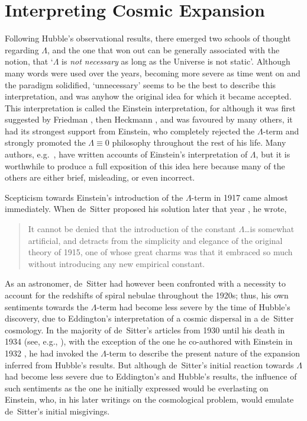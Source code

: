 \section{Interpreting Cosmic Expansion\label{sec_ICE}}
Following Hubble's observational results, there emerged two schools of thought regarding $\Lambda$, and the one that won out can be generally associated with the notion, that `$\Lambda$ is \textit{not necessary} as long as the Universe is not static'. Although many words were used over the years, becoming more severe as time went on and the paradigm solidified, `unnecessary' seems to be the best to describe this interpretation, and was anyhow the original idea for which it became accepted. This interpretation is called the Einstein interpretation, for although it was first suggested by Friedman \cite{Friedmann1922,Friedmann1999a}, then Heckmann \cite{Heckmann1931}, and was favoured by many others, it had its strongest support from Einstein, who completely rejected the $\Lambda$-term and strongly promoted the $\Lambda\equiv0$ philosophy throughout the rest of his life. Many authors, e.g.~\cite{Pais1982,Chandrasekhar1983,Weinberg1989,Padmanabhan2003}, have written accounts of Einstein's interpretation of $\Lambda$, but it is worthwhile to produce a full exposition of this idea here because many of the others are either brief, misleading, or even incorrect.

Scepticism towards Einstein's introduction of the $\Lambda$-term in 1917 \cite{Einstein1917} came almost immediately. When de~Sitter proposed his solution later that year \cite{deSitter1917}, he wrote, 
\begin{quotation}
It cannot be denied that the introduction of the constant $\Lambda$\ldots is somewhat artificial, and detracts from the simplicity and elegance of the original theory of 1915, one of whose great charms was that it embraced so much without introducing any new empirical constant.
\end{quotation}
As an astronomer, de~Sitter had however been confronted with a necessity to account for the redshifts of spiral nebulae throughout the 1920s; thus, his own sentiments towards the $\Lambda$-term had become less severe by the time of Hubble's discovery, due to Eddington's interpretation of a cosmic dispersal in a de~Sitter cosmology. In the majority of de~Sitter's articles from 1930 until his death in 1934 (see, e.g., \cite{deSitter1930,deSitter1933a,deSitter1933b}), with the exception of the one he co-authored with Einstein in 1932 \cite{Einstein1932}, he had invoked the $\Lambda$-term to describe the present nature of the expansion inferred from Hubble's results. But although de~Sitter's initial reaction towards $\Lambda$ had become less severe due to Eddington's and Hubble's results, the influence of such sentiments as the one he initially expressed would be everlasting on Einstein, who, in his later writings on the cosmological problem, would emulate de~Sitter's initial misgivings.
 
